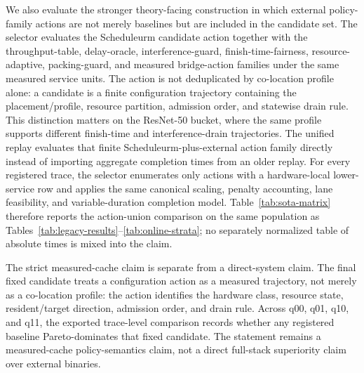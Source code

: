 \documentclass[opre,dblanonrev]{informs4}
\begin{document}
\begin{table}[t]
\end{table}

We also evaluate the stronger theory-facing construction in which external
policy-family actions are not merely baselines but are included in the candidate
set.  The selector evaluates the Scheduleurm candidate action together with the
throughput-table, delay-oracle, interference-guard, finish-time-fairness,
resource-adaptive, packing-guard, and measured bridge-action families under the
same measured service units.  The action is not deduplicated by co-location
profile alone: a candidate is a finite configuration trajectory containing the
placement/profile, resource partition, admission order, and statewise drain
rule.  This distinction matters on the ResNet-50 bucket, where the same profile
supports different finish-time and interference-drain trajectories.
The unified replay evaluates that finite Scheduleurm-plus-external action family
directly instead of importing aggregate completion times from an older replay.
For every registered trace, the selector enumerates only actions with a
hardware-local lower-service row and applies the same canonical scaling,
penalty accounting, lane feasibility, and variable-duration completion model.
Table~\ref{tab:sota-matrix} therefore reports the action-union comparison on the
same population as Tables~\ref{tab:legacy-results}--\ref{tab:online-strata}; no
separately normalized table of absolute times is mixed into the claim.

The strict measured-cache claim is separate from a direct-system claim.  The
final fixed candidate treats a configuration action as a measured trajectory,
not merely as a co-location profile: the action identifies the hardware class,
resource state, resident/target direction, admission order, and drain rule.
Across q00, q01, q10, and q11, the exported trace-level comparison records
whether any registered baseline Pareto-dominates that fixed candidate.  The
statement remains a
measured-cache policy-semantics claim, not a direct full-stack superiority
claim over external binaries.
\end{document}
